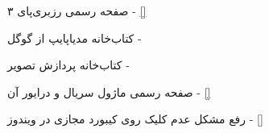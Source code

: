 \documentclass{article}
\begin{document}
\pagebreak
\begin{thebibliography}{9}
 صفحه رسمی رزبری‌پای ۳ - \href{https://www.raspberrypi.com/products/raspberry-pi-3-model-b/}{[]}

 کتاب‌خانه مدیا‌پایپ از گوگل - \href{https://google.github.io/mediapipe/solutions/hands.html}{\lr{[link]}}

 کتاب‌خانه پردازش تصویر  - \href{https://opencv.org/}{\lr{[link]}}

 صفحه رسمی ماژول سریال و درایور آن - \href{https://www.prolific.com.tw/US/ShowProduct.aspx?p_id=225&pcid=41}{[]}

 رفع مشکل عدم کلیک روی کیبورد مجازی در ویندوز - \href{https://stackoverflow.com/a/57339875/12296966}{[]}

\end{thebibliography}
\end{document}
